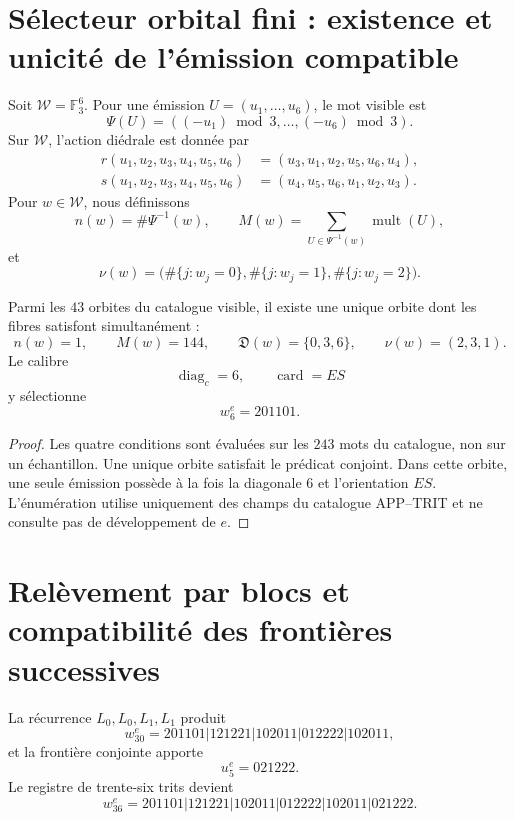
\label{gfp:b:chap:biografia-completa-e}

\section{Sélecteur orbital fini : existence et unicité de l’émission compatible}

Soit \(\mathcal W=\mathbb F_3^6\). Pour une émission
\(U=(u_1,\ldots,u_6)\), le mot visible est
\[
 \Psi(U)=((-u_1)\bmod3,\ldots,(-u_6)\bmod3).
\]
Sur \(\mathcal W\), l’action diédrale est donnée par
\[
\begin{aligned}
 r(u_1,u_2,u_3,u_4,u_5,u_6)
 &=(u_3,u_1,u_2,u_5,u_6,u_4),\\
 s(u_1,u_2,u_3,u_4,u_5,u_6)
 &=(u_4,u_5,u_6,u_1,u_2,u_3).
\end{aligned}
\]
Pour \(w\in\mathcal W\), nous définissons
\[
 n(w)=\#\Psi^{-1}(w),
 \qquad
 M(w)=\sum_{U\in\Psi^{-1}(w)}\operatorname{mult}(U),
\]
et
\[
 \nu(w)=
 \bigl(
 \#\{j:w_j=0\},
 \#\{j:w_j=1\},
 \#\{j:w_j=2\}
 \bigr).
\]

\begin{theorem}
\label{gfp:b:thm:seleccion-estructural-e}
Parmi les \(43\) orbites du catalogue visible, il existe une unique orbite dont les
fibres satisfont simultanément :
\[
 n(w)=1,\qquad M(w)=144,\qquad
 \mathfrak D(w)=\{0,3,6\},\qquad
 \nu(w)=(2,3,1).
\]
Le calibre
\[
 \operatorname{diag}_c=6,
 \qquad \operatorname{card}=ES
\]
y sélectionne
\[
 \boxed{w_6^e=201101.}
\]
\end{theorem}

\begin{proof}
Les quatre conditions sont évaluées sur les \(243\) mots du catalogue,
non sur un échantillon. Une unique orbite satisfait le prédicat conjoint. Dans
cette orbite, une seule émission possède à la fois la diagonale \(6\) et l’orientation
\(ES\). L’énumération utilise uniquement des champs du catalogue APP--TRIT et ne
consulte pas de développement de \(e\).
\end{proof}

\section{Relèvement par blocs et compatibilité des frontières successives}

La récurrence \(L_0,L_0,L_1,L_1\) produit
\[
 w_{30}^{e}
 =201101|121221|102011|012222|102011,
\]
et la frontière conjointe apporte
\[
 u_5^e=021222.
\]
Le registre de trente-six trits devient
\[
 w_{36}^{e}
 =201101|121221|102011|012222|102011|021222.
\]

